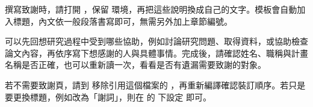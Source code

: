 \begin{acknowledgement}
撰寫致謝時，請打開 ，保留  環境，再把這些說明換成自己的文字。模板會自動加入標題，內文依一般段落書寫即可，無需另外加上章節編號。

可以先回想研究過程中受到哪些協助，例如討論研究問題、取得資料，或協助檢查論文內容，再依序寫下想感謝的人與具體事情。完成後，請確認姓名、職稱與計畫名稱是否正確，也可以重新讀一次，看看是否有遺漏需要致謝的對象。

若不需要致謝頁，請到  移除引用這個檔案的 \code{}，再重新編譯確認裝訂順序。若只是要更換標題，例如改為「謝詞」，則在  的  下設定  即可。
\end{acknowledgement}
